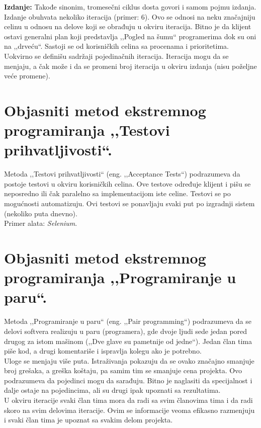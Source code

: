 \documentclass[a4paper]{article}
\begin{document}
  \textbf{Izdanje:} Takođe sinonim, tromesečni ciklus dosta govori i samom pojmu izdanja.
  Izdanje obuhvata nekoliko iteracija (primer: 6). Ovo se odnosi na neku značajniju celinu
  u odnosu na delove koji se obrađuju u okviru iteracija. Bitno je da klijent ostavi generalni
  plan koji predstavlja ,,Pogled na šumu`` programerima dok su oni na ,,drveću``. Sastoji 
  se od korisničkih celina sa procenama i prioritetima. Uokvirno se definišu sadržaji pojedinačnih 
  iteracija. Iteracija mogu da se menjaju, a čak može i da se promeni broj iteracija u okviru 
  izdanja (nisu poželjne veće promene). 
  
\section{Objasniti metod ekstremnog programiranja ,,Testovi prihvatljivosti``.}
  Metoda ,,Testovi prihvatljivosti`` (eng. ,,Acceptance Tests``) podrazumeva 
  da postoje testovi u okviru korisničkih celina. Ove testove određuje klijent i pišu se 
  neposredno ili čak paralelno sa implementacijom iste celine. Testovi se po mogućnosti automatizuju. 
  Ovi testovi se ponavljaju svaki put po izgradnji sistem (nekoliko puta dnevno).
  \cite{xporg_acceptance_tests}\\
  Primer alata: \textit{Selenium}. 

\section{Objasniti metod ekstremnog programiranja ,,Programiranje u paru``.}
  Metoda ,,Programiranje u paru`` (eng. ,,Pair programming``) podrazumeva da se delovi
  softvera realizuju u paru (programera), gde dvoje ljudi sede jedan pored drugog za istom
  mašinom (,,Dve glave su pametnije od jedne``). Jedan član tima piše kod, a drugi komentariše
  i ispravlja kolegu ako je potrebno. \\
  \indent Uloge se menjaju više puta. Istraživanja pokazuju da
  se ovako značajno smanjuje broj grešaka, a greška koštaju, pa samim tim se smanjuje
  cena projekta. Ovo podrazumeva da pojedinci mogu da sarađuju. Bitno je naglasiti
  da specijalnost i dalje ostaje na pojedincima, ali su drugi ipak upoznati sa rezultatima.\\
  \indent U okviru iteracije svaki član tima mora da radi sa svim članovima tima i da radi skoro na
  svim delovima iteracije. Ovim se informacije veoma efikasno razmenjuju i svaki član tima je
  upoznat sa svakim delom projekta.\\
\end{document}

